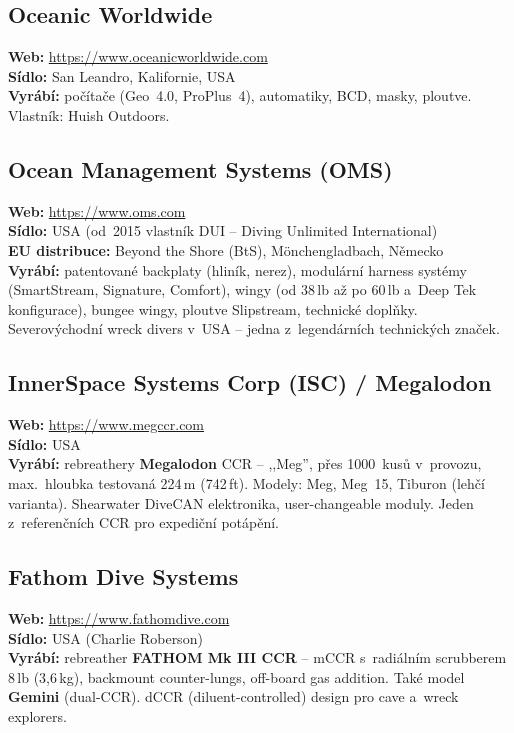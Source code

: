 \documentclass[11pt,a4paper]{article}
\begin{document}
\subsection{Oceanic Worldwide}
\textbf{Web:} \url{https://www.oceanicworldwide.com} \\
\textbf{Sídlo:} San Leandro, Kalifornie, USA \\
\textbf{Vyrábí:} počítače (Geo~4.0, ProPlus~4), automatiky, BCD, masky, ploutve. Vlastník: Huish Outdoors.

\subsection{Ocean Management Systems (OMS)}
\textbf{Web:} \url{https://www.oms.com} \\
\textbf{Sídlo:} USA (od~2015 vlastník DUI -- Diving Unlimited International) \\
\textbf{EU distribuce:} Beyond the Shore (BtS), Mönchengladbach, Německo \\
\textbf{Vyrábí:} patentované backplaty (hliník, nerez), modulární harness systémy (SmartStream, Signature, Comfort), wingy (od 38\,lb až po 60\,lb a~Deep Tek konfigurace), bungee wingy, ploutve Slipstream, technické doplňky. Severovýchodní wreck divers v~USA -- jedna z~legendárních technických značek.

\subsection{InnerSpace Systems Corp (ISC) / Megalodon}
\textbf{Web:} \url{https://www.megccr.com} \\
\textbf{Sídlo:} USA \\
\textbf{Vyrábí:} rebreathery \textbf{Megalodon} CCR -- ,,Meg'', přes 1000~kusů v~provozu, max.~hloubka testovaná 224\,m (742\,ft). Modely: Meg, Meg~15, Tiburon (lehčí varianta). Shearwater DiveCAN elektronika, user-changeable moduly. Jeden z~referenčních CCR pro expediční potápění.

\subsection{Fathom Dive Systems}
\textbf{Web:} \url{https://www.fathomdive.com} \\
\textbf{Sídlo:} USA (Charlie Roberson) \\
\textbf{Vyrábí:} rebreather \textbf{FATHOM Mk III CCR} -- mCCR s~radiálním scrubberem 8\,lb (3,6\,kg), backmount counter-lungs, off-board gas addition. Také model \textbf{Gemini} (dual-CCR). dCCR (diluent-controlled) design pro cave a~wreck explorers.
\end{document}
